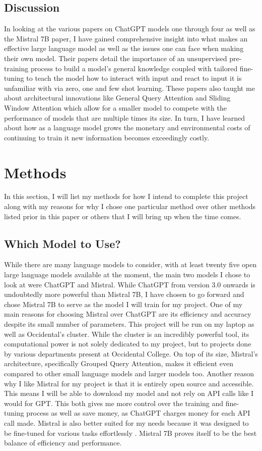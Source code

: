 \documentclass[10pt,twocolumn]{article}
\begin{document}
\subsection{Discussion}
In looking at the various papers on ChatGPT models one through four as well as the Mistral 7B paper, I have gained comprehensive insight into what makes an effective large language model as well as the issues one can face when making their own model. Their papers detail the importance of an unsupervised pre-training process to build a model’s general knowledge coupled with tailored fine-tuning to teach the model how to interact with input and react to input it is unfamiliar with via zero, one and few shot learning. These papers also taught me about architectural innovations like General Query Attention and Sliding Window Attention which allow for a smaller model to compete with the performance of models that are multiple times its size. In turn, I have learned about how as a language model grows the monetary and environmental costs of continuing to train it new information becomes exceedingly costly.

\section{Methods}
In this section, I will list my methods for how I intend to complete this project along with my reasons for why I chose one particular method over other methods listed prior in this paper or others that I will bring up when the time comes.

\subsection{Which Model to Use?}

While there are many language models to consider, with at least twenty five open large language models available at the moment, the main two models I chose to look at were ChatGPT and Mistral. While ChatGPT from version 3.0 onwards is undoubtedly more powerful than Mistral 7B, I have chosen to go forward and chose Mistral 7B to serve as the model I will train for my project. One of my main reasons for choosing Mistral over ChatGPT are its efficiency and accuracy despite its small number of parameters. This project will be run on my laptop as well as Occidental’s cluster. While the cluster is an incredibly powerful tool, its computational power is not solely dedicated to my project, but to projects done by various departments present at Occidental College. On top of its size, Mistral’s architecture, specifically Grouped Query Attention, makes it efficient even compared to other small language models and larger models too. Another reason why I like Mistral for my project is that it is entirely open source and accessible. This means I will be able to download my model and not rely on API calls like I would for GPT. This both gives me more control over the training and fine-tuning process as well as save money, as ChatGPT charges money for each API call made. Mistral is also better suited for my needs because it was designed to be fine-tuned for various tasks effortlessly \cite{gathnex_mistral-7b_2023}. Mistral 7B proves itself to be the best balance of efficiency and performance.
\end{document}
